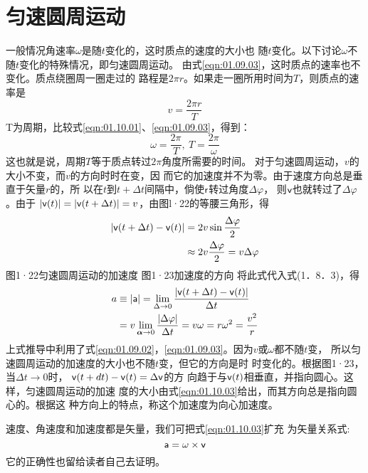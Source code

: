 \section{匀速圆周运动}\label{sec:01.10}

    一般情况角速率$\omega$是随$t$变化的，这时质点的速度的大小也
随$t$变化。以下讨论$\omega$不随$t$变化的特殊情况，即匀速圆周运动。
由式\eqref{eqn:01.09.03}，这时质点的速率也不变化。质点绕圈周一圈走过的
路程是$2\pi r$。如果走一圈所用时间为$T$，则质点的速率是
\begin{equation}\label{eqn:01.10.01}
    v=\frac{2 \pi r}{T}
\end{equation}
T为周期，比较式\eqref{eqn:01.10.01}、\eqref{eqn:01.09.03}，得到：
\begin{equation}\label{eqn:01.10.02}
    \omega=\frac{2 \pi}{T}, ~ T=\frac{2 \pi}{\omega}
\end{equation}
这也就是说，周期$T$等于质点转过$2\pi$角度所需要的时间。
    对于匀速圆周运动，$v$的大小不变，而$v$的方向时时在变，因
而它的加速度并不为零。由于速度方向总是垂直于矢量$r$的，所
以在$t$到$t+\Delta t$间隔中，倘使${\sf r}$转过角度$\Delta\varphi$，
则${\sf v}$也就转过了$\Delta\varphi$。由于
$|{\sf v}(t)|=|{\sf v}(t+\Delta t)|=v$，由图l·22的等腰三角形，得
\begin{equation*}
    \begin{aligned}
        |{\sf v}(t+\Delta t)-{\sf v}(t)| &=2 v \sin \frac{\Delta \varphi}{2} \\
        & \approx 2 v\frac{\Delta \varphi}{2}=v \Delta \varphi
    \end{aligned}
\end{equation*}
图1·22匀速圆周运动的加速度    图1·23加速度的方向
将此式代入式(1．8．3)，得
\begin{equation}\label{eqn:01.10.03}
    \begin{aligned}
        a & \equiv|{\sf a}|=\lim _{\Delta \rightarrow 0} \frac{|{\sf v}(t+\Delta t)-{\sf v}(t)|}{\Delta t} \\
        &=v\lim_{\boldsymbol{\alpha} \rightarrow 0} \frac{|\Delta \varphi|}{\Delta t}=v \omega=r \omega^{2}=\frac{v^{2}}{r}
    \end{aligned}
\end{equation}
上式推导中利用了式\eqref{eqn:01.09.02}，\eqref{eqn:01.09.03}。因为$v$或$\omega$都不随$t$变，
所以匀速圆周运动的加速度的大小也不随$t$变，但它的方向是时
时变化的。根据图1·23，当$\Delta t\rightarrow 0$时，
${\sf v}(t+dt)-{\sf v}(t)=\Delta{\sf v}$的方
向趋于与${\sf v}(t)$相垂直，并指向圆心。这样，匀速圆周运动的加速
度的大小由式\eqref{eqn:01.10.03}给出，而其方向总是指向圆心的。根据这
种方向上的特点，称这个加速度为向心加速度。

速度、角速度和加速度都是矢量，我们可把式\eqref{eqn:01.10.03}扩充
为矢量关系式:
\begin{equation}\label{eqn:01.10.04}
    {\sf a}=\omega\times {\sf v}
\end{equation}
它的正确性也留给读者自己去证明。